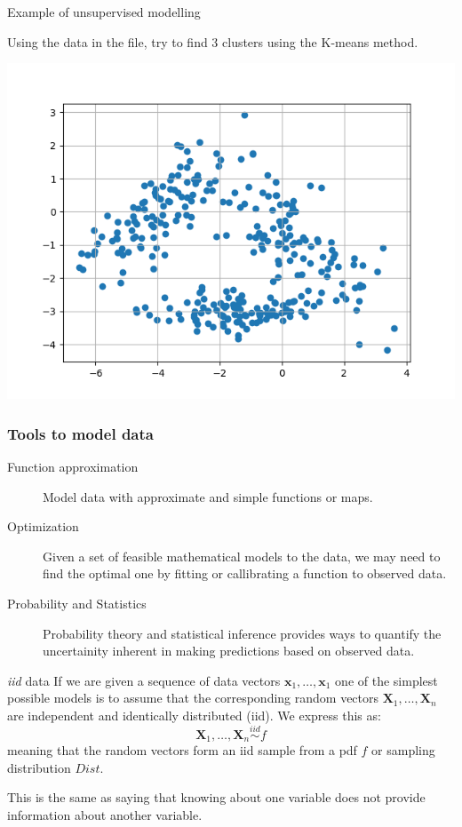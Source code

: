\documentclass{beamer}
\begin{document}
\begin{frame}{Example of unsupervised modelling}
  \begin{Exercise}[title={Unsupervised learning}]
    Using the data in the file, try to find 3 clusters using the K-means method.
    \begin{center}
     \includegraphics[width=0.6\linewidth]{data}
    \end{center}
  \end{Exercise}
\end{frame}

\begin{frame}
\frametitle{Tools to model data}

\begin{description}
  \item [Function approximation] Model data with approximate and simple functions or maps.
  \item [Optimization] Given a set of feasible mathematical models to the data, we may need to find the optimal one by fitting or callibrating a function to observed data.
  \item [Probability and Statistics] Probability theory and statistical inference provides ways to quantify the uncertainity inherent in making predictions based on observed data.
\end{description}
\end{frame}


\begin{frame}{{\em iid} data}
  If we are given a sequence of data vectors $\bm{x}_1,\ldots,\bm{x}_1$ one of the simplest possible models is to assume that the corresponding random vectors $\bm{X}_1,\ldots,\bm{X}_n$ are independent and identically distributed (iid). We express this as:
  \[\bm{X}_1,\ldots,\bm{X}_n \stackrel{iid}{\sim} f \]
  meaning that the random vectors form an iid sample from a pdf $f$ or sampling distribution $Dist$.

  This is the same as saying that knowing about one variable does not provide information about another variable.
\end{frame}
\end{document}
